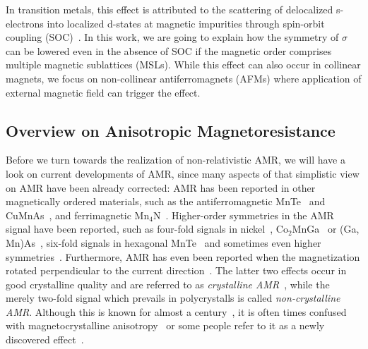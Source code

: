 \documentclass[prb,showpacs,amsmath,amssymb,superscriptaddress,twocolumn,floatfix]{revtex4-1}
\begin{document}
In transition metals, this
effect is attributed to the scattering of delocalized s-electrons into
localized d-states at magnetic impurities through spin-orbit coupling
(SOC)~\cite{McGuire:1975}. In this work, we are going to explain how the
symmetry of $\sigma$ can be lowered even in the absence of SOC if the
magnetic order comprises multiple magnetic sublattices (MSLs). While this
effect can also occur in collinear magnets, we focus on non-collinear
antiferromagnets (AFMs) where application of external magnetic field
can trigger the effect.

\subsection{Overview on Anisotropic Magnetoresistance}

Before we turn towards the realization of non-relativistic AMR, we will have a look on current developments of AMR, since many aspects of that simplistic view on AMR have been already corrected: AMR has been reported in other magnetically ordered materials, such as the antiferromagnetic MnTe~\cite{Gonzalez-Betancourt:2024, Kriegner:2017} and CuMnAs~\cite{Volny:2020, Zubac:2021, Wadley:2016}, and ferrimagnetic Mn$_4$N~\cite{Kabara:2017}. Higher-order symmetries in the AMR signal have been reported, such as four-fold signals in nickel~\cite{Doring:1938}, Co$_2$MnGa~\cite{Ritzinger:2021, Sato:2019} or (Ga, Mn)As~\cite{Limmer:2008, DeRanieri:2008}, six-fold signals in hexagonal MnTe~\cite{Gonzalez-Betancourt:2024, Kriegner:2017} and sometimes even higher symmetries~\cite{Gonzalez-Betancourt:2024, NamHai:2012}. Furthermore, AMR has even been reported when the magnetization rotated perpendicular to the current direction~\cite{Ritzinger:2021, Limmer:2008, Limmer:2006}. The latter two effects occur in good crystalline quality and are referred to as \textit{crystalline AMR}~\cite{Ritzinger:2021, DeRanieri:2008}, while the merely two-fold signal which prevails in polycrystalls is called \textit{non-crystalline AMR}. Although this is known for almost a century~\cite{Doring:1938}, it is often times confused with magnetocrystalline anisotropy~\cite{Ritzinger:2023} or some people refer to it as a newly discovered effect~\cite{Dong:2023}.
\end{document}

